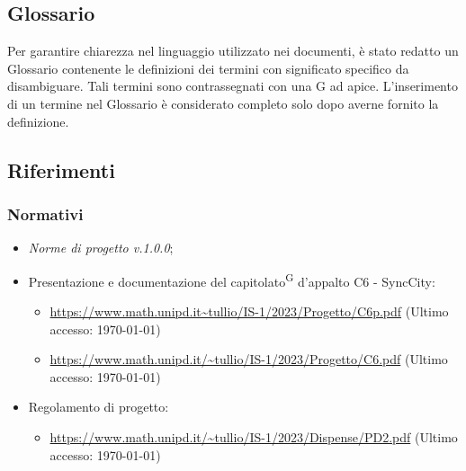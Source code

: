 \documentclass[8pt]{article}
\newcommand{\glossterm}[1]{#1\textsuperscript{G}} %
\begin{document}
\subsection{Glossario}
Per garantire chiarezza nel linguaggio utilizzato nei documenti, è stato redatto un Glossario contenente le definizioni dei termini con significato specifico da disambiguare. Tali termini sono contrassegnati con una G ad apice. L'inserimento di un termine nel Glossario è considerato completo solo dopo averne fornito la definizione.
\subsection{Riferimenti}
\subsubsection{Normativi}
\begin{itemize}
	\item \textit{Norme di progetto v.1.0.0};
	\item Presentazione e documentazione del \glossterm{capitolato} d’appalto C6 - SyncCity:
	\begin{itemize}
		\item \href{https://www.math.unipd.it/~tullio/IS-1/2023/Progetto/C6p.pdf}{\color{myblue}https://www.math.unipd.it\textasciitilde{}tullio/IS-1/2023/Progetto/C6p.pdf} (Ultimo accesso: \today)
		\item \href{https://www.math.unipd.it/~tullio/IS-1/2023/Progetto/C6.pdf}{\color{myblue}https://www.math.unipd.it/\textasciitilde{}tullio/IS-1/2023/Progetto/C6.pdf} (Ultimo accesso: \today)
	\end{itemize}
	\item Regolamento di progetto:
	\begin{itemize}
		\item \href{https://www.math.unipd.it/~tullio/IS-1/2023/Dispense/PD2.pdf}{\color{myblue}https://www.math.unipd.it/\textasciitilde{}tullio/IS-1/2023/Dispense/PD2.pdf} (Ultimo accesso: \today)
	\end{itemize}
\end{itemize}
\clearpage
\end{document}
